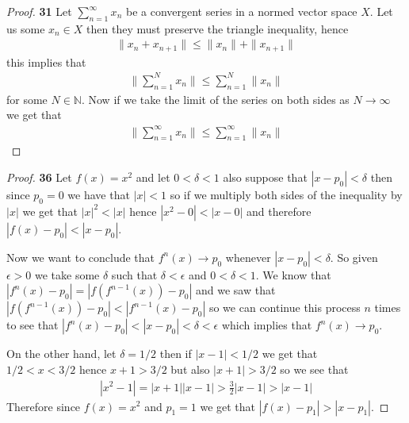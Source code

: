 \documentclass[11pt]{article}
\newcommand{\N}{\mathbb{N}}
\theoremstyle{definition}
\begin{document}
\cleardoublepage
    \begin{proof}{\textbf{31}}
        Let $\sum_{n=1}^\infty x_n$ be a convergent series in a normed vector
        space $X$.
        Let us some $x_n \in X$ then they must preserve the triangle
        inequality, hence
        \begin{align*}
            \|x_n + x_{n+1}\| \leq \|x_n\| + \|x_{n+1}\|
        \end{align*}
        this implies that
        \begin{align*}
            \bigg\|\sum_{n=1}^N x_n\bigg\| \leq \sum_{n=1}^N \|x_n\|
        \end{align*}
        for some $N \in \N$. Now if we take the limit of the series on both 
        sides as $N \to \infty$ we get that
        \begin{align*}
            \bigg\|\sum_{n=1}^\infty x_n\bigg\| \leq \sum_{n=1}^\infty \|x_n\|
        \end{align*}
    \end{proof}
    \begin{proof}{\textbf{36}}
        Let $f(x) = x^2$ and let $0 < \delta < 1$ also suppose that
        $|x - p_0| < \delta$ then
        since $p_0 = 0$ we have that $|x|< 1$ so if we multiply both sides of
        the inequality by $|x|$ we get that $|x|^2 < |x|$ hence
        $|x^2 - 0| < |x - 0|$ and therefore $|f(x) - p_0| < |x - p_0|$.

        Now we want to conclude that $f^n(x) \to p_0$ whenever
        $|x - p_0| < \delta$. So given $\epsilon > 0$ we take some $\delta$
        such that $\delta < \epsilon$ and $0 < \delta < 1$. We know that
        $|f^n(x) - p_0| = |f(f^{n-1}(x)) - p_0|$ and we saw that
        $|f(f^{n-1}(x)) - p_0| < |f^{n-1}(x) - p_0|$ so we can continue this
        process $n$ times to see that
        $|f^n(x) - p_0| < |x - p_0| < \delta < \epsilon$ which implies that
        $f^{n}(x) \to p_0$.
        
        On the other hand, let $\delta = 1/2$ then if $|x-1| < 1/2$ we get that\\
        $1/2 < x < 3/2$ hence $x+1 > 3/2$ but also $|x + 1| > 3/2$ so
        we see that
        \begin{align*}
            |x^2 - 1| = |x + 1||x - 1| > \frac{3}{2}|x - 1| > |x - 1| 
        \end{align*}
        Therefore since $f(x) = x^2$ and $p_1 = 1$ we get that
        $|f(x) - p_1| > |x - p_1|$.
    \end{proof}
\cleardoublepage
\end{document}
